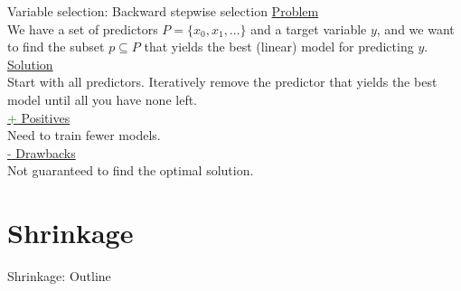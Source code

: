 \documentclass[8pt]{beamer}
\begin{document}
    \begin{frame}[t]{Variable selection: Backward stepwise selection}
        \underline{Problem}\\
        We have a set of predictors $P=\{x_0, x_1, ...\}$ and a target variable $y$, and we want to find the subset $p \subseteq P$ that yields the best (linear) model for predicting $y$.\\
        \vspace{0.25cm}
        \underline{Solution}\\
        Start with all predictors. Iteratively remove the predictor that yields the best model until all you have none left.\\
        \vspace{0.25cm}
        \underline{\textcolor{green}{+} Positives}\\
        Need to train fewer models.\\
        \vspace{0.25cm}
        \underline{\textcolor{red}{-} Drawbacks}\\
        Not guaranteed to find the optimal solution.\\
    \end{frame}

    \section{Shrinkage}

    \def\codewidth{5.2cm}

    \begin{frame}[fragile]{Shrinkage: Outline} %
        \centering
        \vfill
        \\
        \vfill
    \end{frame}
\end{document}
